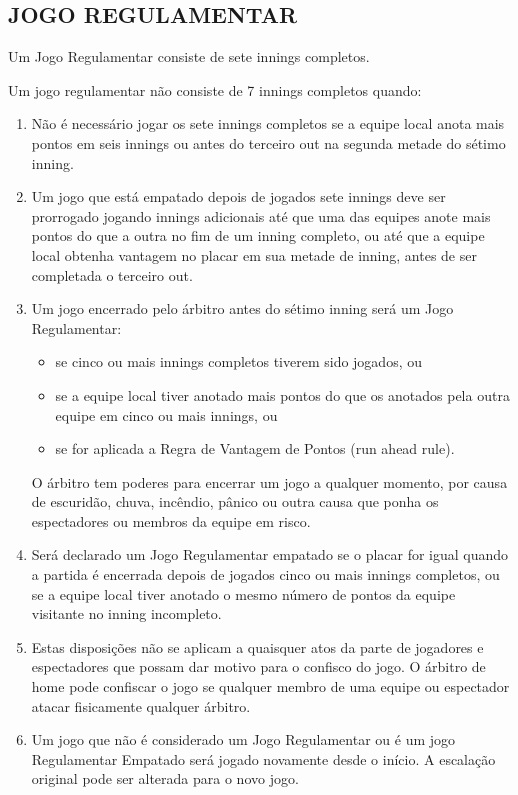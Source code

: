 \begin{multicols}{2}
\subsection{JOGO REGULAMENTAR}

Um Jogo Regulamentar consiste de sete \glspl{inning} completos.

Um jogo regulamentar não consiste de 7 \glspl{inning} completos quando: 

\begin{enumerate}[label=\alph*)]
	\item N\~ao \'e necess\'ario jogar os sete \glspl{inning} completos se a equipe local anota mais pontos em seis \glspl{inning} ou antes do terceiro \gls{out} na segunda metade do s\'etimo \gls{inning}. 

	\item  Um jogo que est\'a empatado depois de jogados sete \glspl{inning} deve ser prorrogado jogando \glspl{inning} adicionais at\'e que uma das equipes anote mais pontos do que a outra no fim de um \gls{inning} completo, ou at\'e que a equipe local obtenha vantagem no placar em sua metade de \gls{inning}, antes de ser completada o terceiro \gls{out}. 

	\item  Um jogo encerrado pelo \'arbitro antes do s\'etimo \gls{inning} ser\'a um Jogo Regulamentar: 
	\begin{itemize}
		\item  se cinco ou mais \glspl{inning} completos tiverem sido jogados, ou 
		\item se a equipe local tiver anotado mais pontos do que os anotados pela outra equipe em cinco ou mais \glspl{inning}, ou 
		\item se for aplicada a Regra de Vantagem de Pontos (\Gls{run ahead rule}). 
	\end{itemize}
	O \'arbitro tem poderes para encerrar um jogo a qualquer momento, por causa de escurid\~ao, chuva, inc\^endio, p\^anico ou outra causa que ponha os espectadores ou membros da equipe em risco. 

	\item  Ser\'a declarado um Jogo Regulamentar empatado se o placar for igual quando a partida \'e encerrada depois de jogados cinco ou mais \glspl{inning} completos, ou se a equipe local tiver anotado o mesmo n\'umero de pontos da equipe visitante no \gls{inning} incompleto.
	
	\item Estas disposi\c{c}\~oes n\~ao se aplicam a quaisquer atos da parte de jogadores e espectadores que possam dar motivo para o confisco do jogo. O \'arbitro de \gls{home} pode confiscar o jogo se qualquer membro de uma equipe ou espectador atacar fisicamente qualquer \'arbitro. 
	\item  Um jogo que n\~ao \'e considerado um Jogo Regulamentar ou \'e um jogo Regulamentar Empatado ser\'a jogado novamente desde o in\'icio. A escala\c{c}\~ao original pode ser alterada para o novo jogo. 
\end{enumerate}


\end{multicols}
